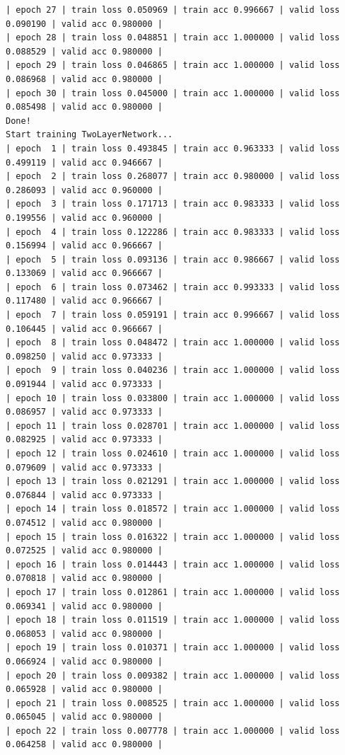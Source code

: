 \documentclass[10pt]{article}
\begin{document}
\begin{verbatim}
| epoch 27 | train loss 0.050969 | train acc 0.996667 | valid loss 0.090190 | valid acc 0.980000 |
| epoch 28 | train loss 0.048851 | train acc 1.000000 | valid loss 0.088529 | valid acc 0.980000 |
| epoch 29 | train loss 0.046865 | train acc 1.000000 | valid loss 0.086968 | valid acc 0.980000 |
| epoch 30 | train loss 0.045000 | train acc 1.000000 | valid loss 0.085498 | valid acc 0.980000 |
Done!
Start training TwoLayerNetwork...
| epoch  1 | train loss 0.493845 | train acc 0.963333 | valid loss 0.499119 | valid acc 0.946667 |
| epoch  2 | train loss 0.268077 | train acc 0.980000 | valid loss 0.286093 | valid acc 0.960000 |
| epoch  3 | train loss 0.171713 | train acc 0.983333 | valid loss 0.199556 | valid acc 0.960000 |
| epoch  4 | train loss 0.122286 | train acc 0.983333 | valid loss 0.156994 | valid acc 0.966667 |
| epoch  5 | train loss 0.093136 | train acc 0.986667 | valid loss 0.133069 | valid acc 0.966667 |
| epoch  6 | train loss 0.073462 | train acc 0.993333 | valid loss 0.117480 | valid acc 0.966667 |
| epoch  7 | train loss 0.059191 | train acc 0.996667 | valid loss 0.106445 | valid acc 0.966667 |
| epoch  8 | train loss 0.048472 | train acc 1.000000 | valid loss 0.098250 | valid acc 0.973333 |
| epoch  9 | train loss 0.040236 | train acc 1.000000 | valid loss 0.091944 | valid acc 0.973333 |
| epoch 10 | train loss 0.033800 | train acc 1.000000 | valid loss 0.086957 | valid acc 0.973333 |
| epoch 11 | train loss 0.028701 | train acc 1.000000 | valid loss 0.082925 | valid acc 0.973333 |
| epoch 12 | train loss 0.024610 | train acc 1.000000 | valid loss 0.079609 | valid acc 0.973333 |
| epoch 13 | train loss 0.021291 | train acc 1.000000 | valid loss 0.076844 | valid acc 0.973333 |
| epoch 14 | train loss 0.018572 | train acc 1.000000 | valid loss 0.074512 | valid acc 0.980000 |
| epoch 15 | train loss 0.016322 | train acc 1.000000 | valid loss 0.072525 | valid acc 0.980000 |
| epoch 16 | train loss 0.014443 | train acc 1.000000 | valid loss 0.070818 | valid acc 0.980000 |
| epoch 17 | train loss 0.012861 | train acc 1.000000 | valid loss 0.069341 | valid acc 0.980000 |
| epoch 18 | train loss 0.011519 | train acc 1.000000 | valid loss 0.068053 | valid acc 0.980000 |
| epoch 19 | train loss 0.010371 | train acc 1.000000 | valid loss 0.066924 | valid acc 0.980000 |
| epoch 20 | train loss 0.009382 | train acc 1.000000 | valid loss 0.065928 | valid acc 0.980000 |
| epoch 21 | train loss 0.008525 | train acc 1.000000 | valid loss 0.065045 | valid acc 0.980000 |
| epoch 22 | train loss 0.007778 | train acc 1.000000 | valid loss 0.064258 | valid acc 0.980000 |

\end{verbatim}
\end{document}
